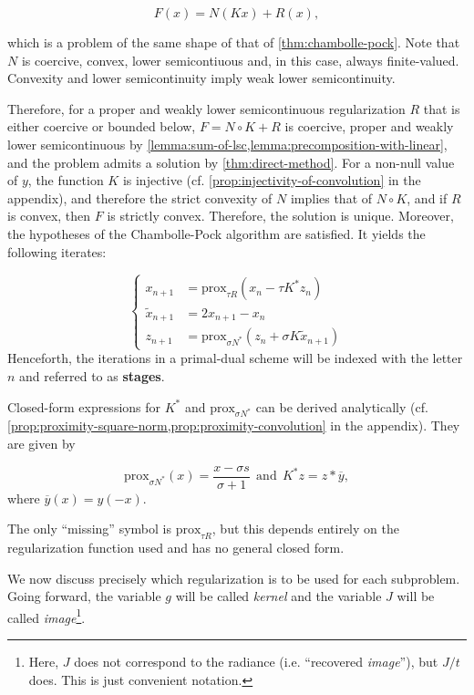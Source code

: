 \documentclass[twocolumn,twoside,a4paper,10pt]{IEEEtran}
\begin{document}
\[
  F(x) = N(Kx) + R(x),
\]

which is a problem of the same shape of that of \cref{thm:chambolle-pock}. Note that \(N\) is coercive, convex, lower semicontiuous and, in this case, always finite-valued. Convexity and lower semicontinuity imply weak lower semicontinuity.

Therefore, for a proper and weakly lower semicontinuous regularization \(R\) that is either coercive or bounded below,
\(F=N\circ K + R\) is coercive, proper and weakly lower semicontinuous by \cref{lemma:sum-of-lsc,lemma:precomposition-with-linear}, and the problem admits a solution by \cref{thm:direct-method}. For a non-null value of \(y\), the function \(K\) is injective (cf. \cref{prop:injectivity-of-convolution} in the appendix), and therefore the strict convexity of \(N\) implies that of \(N\circ K\), and if \(R\) is convex, then \(F\) is strictly convex. Therefore, the solution is unique. Moreover, the hypotheses of the Chambolle-Pock algorithm are satisfied. It yields the following iterates:

\begin{equation}\label{eq:iterates}
  \left\{
  \begin{split}
    x_{n+1} & = \text{prox}_{\tau R}(x_n - \tau K^*z_n) \\
    \tilde{x}_{n+1} & = 2x_{n+1} - x_n \\
    z_{n+1} & = \text{prox}_{\sigma N^*}(z_n + \sigma K\tilde{x}_{n+1})
  \end{split}
  \right.
\end{equation}
Henceforth, the iterations in a primal-dual scheme will be indexed with the letter \(n\) and referred to as \textbf{stages}.

Closed-form expressions for \(K^*\) and \(\text{prox}_{\sigma N^*}\) can be derived analytically (cf. \cref{prop:proximity-square-norm,prop:proximity-convolution} in the appendix). They are given by

\begin{equation}\label{eq:primal-dual-analytical}
  \text{prox}_{\sigma N^*}(x) = \frac{x-\sigma s}{\sigma + 1} ~~ \text{and} ~~ K^*z = z\ast \overline{y},
\end{equation}
where \(\overline{y}(x) = y(-x)\).

The only ``missing'' symbol is \(\text{prox}_{\tau R}\), but this depends entirely on the regularization function used and has no general closed form.

We now discuss precisely which regularization is to be used for each subproblem. Going forward, the variable \(g\) will be called \textit{kernel} and the variable \(J\) will be called \textit{image}\footnote{Here, \(J\) does not correspond to the radiance (i.e. ``recovered \textit{image}''), but \(J/t\) does. This is just convenient notation.}.
\end{document}
